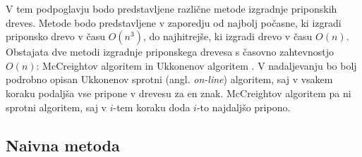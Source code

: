 V tem podpoglavju bodo predstavljene različne metode izgradnje priponskih dreves. Metode bodo predstavljene v zaporedju od najbolj počasne, ki izgradi priponsko drevo v času $O(n^3)$, do najhitrejše, ki izgradi drevo v času $O(n)$. Obstajata dve metodi izgradnje priponskega drevesa s časovno zahtevnostjo $O(n)$: McCreightov algoritem \cite{McCreight1976} in Ukkonenov algoritem \cite{Ukkonen1995}. V nadaljevanju bo bolj podrobno opisan Ukkonenov sprotni (angl. \textit{on-line}) algoritem, saj v vsakem koraku podaljša vse pripone v drevesu za en znak. McCreightov algoritem pa ni sprotni algoritem, saj v $i$-tem koraku doda $i$-to najdaljšo pripono.

\subsection{Naivna metoda}

